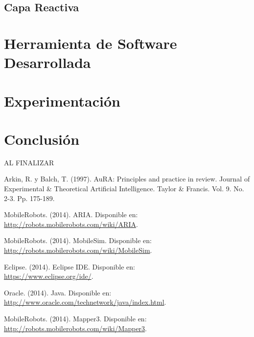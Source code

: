 \documentclass[11pt,twoside,A5]{article}
\newcommand{\link}[1]{{\footnotesize\url{#1}}}
\begin{document}
\subsection*{Capa Reactiva}

\section*{Herramienta de Software Desarrollada}

\section*{Experimentación}

\section*{Conclusión}

AL FINALIZAR

\begin{thebibliography}{999}

	Arkin, R. y Balch, T. (1997).
 	AuRA: Principles and practice in review.
	Journal of Experimental \& Theoretical Artificial Intelligence.
	Taylor \& Francis. Vol. 9. No. 2-3. Pp. 175-189.
	
	MobileRobots. (2014).
	ARIA. 	
	Disponible en: \\\link{http://robots.mobilerobots.com/wiki/ARIA}.
	
	MobileRobots. (2014).
	MobileSim. 	
	Disponible en: \\\link{http://robots.mobilerobots.com/wiki/MobileSim}.
	
	Eclipse. (2014).
	Eclipse IDE. 	
	Disponible en: \\\link{https://www.eclipse.org/ide/}.

	Oracle. (2014).
	Java. 	
	Disponible en: \\\link{http://www.oracle.com/technetwork/java/index.html}.
	
	MobileRobots. (2014).
	Mapper3. 	
	Disponible en: \\\link{http://robots.mobilerobots.com/wiki/Mapper3}.
	
\end{thebibliography}
\end{document}
